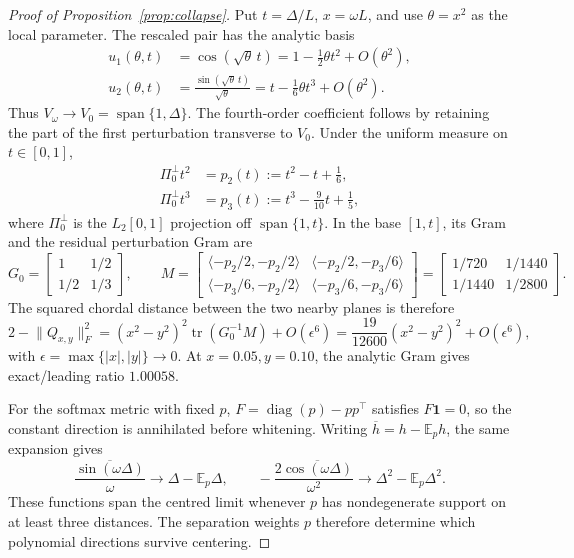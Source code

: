 \begin{proof}[Proof of Proposition~\ref{prop:collapse}]
Put $t=\Delta/L$, $x=\omega L$, and use $\theta=x^2$ as the local parameter.
The rescaled pair has the analytic basis
\begin{align}
u_1(\theta,t)&=\cos(\sqrt\theta\,t)
 =1-\tfrac12\theta t^2+O(\theta^2),\\
u_2(\theta,t)&=\frac{\sin(\sqrt\theta\,t)}{\sqrt\theta}
 =t-\tfrac16\theta t^3+O(\theta^2).
\label{eq:slow-basis-expansion}
\end{align}
Thus $V_\omega\to V_0=\operatorname{span}\{1,\Delta\}$.  The fourth-order
coefficient follows by retaining the part of the first perturbation transverse
to $V_0$. Under the
uniform measure on $t\in[0,1]$,
\begin{align}
\Pi_0^\perp t^2&=p_2(t):=t^2-t+\tfrac16,\\
\Pi_0^\perp t^3&=p_3(t):=t^3-\tfrac9{10}t+\tfrac15,
\label{eq:slow-residual-polynomials}
\end{align}
where $\Pi_0^\perp$ is the $L_2[0,1]$ projection off
$\operatorname{span}\{1,t\}$.  In the base $[1,t]$, its Gram and the residual
perturbation Gram are
\begin{equation}
G_0=
\begin{bmatrix}1&1/2\\[1pt]1/2&1/3\end{bmatrix},\qquad
M=
\begin{bmatrix}
\langle-p_2/2,-p_2/2\rangle&\langle-p_2/2,-p_3/6\rangle\\
\langle-p_3/6,-p_2/2\rangle&\langle-p_3/6,-p_3/6\rangle
\end{bmatrix}
=\begin{bmatrix}1/720&1/1440\\[1pt]1/1440&1/2800\end{bmatrix}.
\label{eq:slow-residual-gram}
\end{equation}
The squared chordal distance between the two nearby planes is therefore
\begin{equation}
2-\lVert Q_{x,y}\rVert_F^2
=(x^2-y^2)^2\operatorname{tr}(G_0^{-1}M)+O(\epsilon^6)
=\frac{19}{12600}(x^2-y^2)^2+O(\epsilon^6),
\label{eq:slow-collapse-expanded}
\end{equation}
with $\epsilon=\max\{|x|,|y|\}\to0$. At $x=0.05,y=0.10$, the analytic
Gram gives exact/leading ratio $1.00058$.

For the softmax metric with fixed $p$,
$F=\operatorname{diag}(p)-pp^\top$ satisfies $F\mathbf1=0$, so the constant
direction is annihilated before whitening.  Writing
$\overline h=h-\mathbb E_p h$, the same expansion gives
\begin{equation}
\frac{\overline{\sin(\omega\Delta)}}{\omega}
 \longrightarrow \Delta-\mathbb E_p\Delta,
\qquad
-\frac{2\overline{\cos(\omega\Delta)}}{\omega^2}
 \longrightarrow \Delta^2-\mathbb E_p\Delta^2.
\end{equation}
These functions span the centred limit whenever $p$ has nondegenerate support
on at least three distances. The separation weights $p$ therefore determine
which polynomial directions survive centering.
\end{proof}

